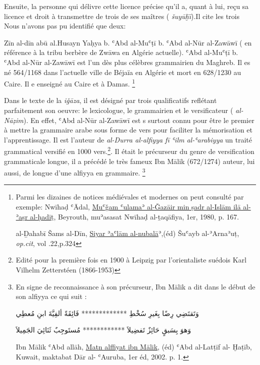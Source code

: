 \documentclass[a4paper,12pt]{report}
\begin{document}
Ensuite, la personne qui délivre cette licence précise  qu'il a, quant à lui, reçu sa licence et droit à transmettre de trois de ses maîtres ( \textit{šuyūḫ\=i}̄).Il cite les trois  
Nous n'avons pas pu identifié que deux: 

 Zīn al-dīn  abū al.Husayn Yaḥya b. ʿAbd al-Muʿṭī b. ʿAbd al-Nūr al-Zawāwī ( en référence à la tribu berbère de   Zw\=awa en  Algérie actuelle). 
  ʿAbd al-Muʿṭī b. ʿAbd al-Nūr al-Zawāwī est l'un dès plus célèbres grammairien du Maghreb.
  Il es né 564/1168  dans  l'actuelle ville de Béjaïa en Algérie  et mort en 628/1230 au Caire. Il e enseigné au Caire et à Damas. \footnote{ Parmi les dizaines de notices médiévales et modernes on peut consulté par exemple: Nwīhaḍ ʿĀdal, \underline {Muʿǧam ʿulamaʾ al-Ǧazāir min ṣadr al-Islām ilā al-ʾaṣr al-ḥadī}ṯ, Beyrouth,  muʾasasat Nwīhaḍ al-ṯaqāfiya, 1er, 1980, p. 167.
  
  al-Ḏahabī Šams al-Dīn, \underline  { Siyar ʾaʿlām al-nubalā}ʾ,(éd) Šuʿayb al-ʾArnaʾuṭ, \textit{op.cit}, vol
  .22,p.324}

Dans le texte de la \textit{iǧāza}, il est désigné par trois qualificatifs reflétant parfaitement son oeuvre: le lexicologue, le grammairien  et le versificateur ( \textit{al-Nāẓim}). En effet, ʿAbd al-Nūr al-Zawāwī est  s
surtout connu pour être le premier à mettre la grammaire arabe sous forme de vers pour faciliter la mémorisation et l'apprentissage. Il est l'auteur de \textit{al-Durra al-alfiyya fī ʿilm al-ʿarabiyya } un traité grammatical versifié en 1000 vers.\footnote{Edité pour la première fois en 1900 à Leipzig par l'orientaliste suédois Karl Vilhelm Zetterstéen (1866-1953)}. Il était le précurseur du genre de versification grammaticale longue, il a précédé le très fameux Ibn Mālik (672/1274) auteur, lui aussi, de longue d'une  alfiyya en grammaire. \footnote{En signe de  reconnaissance à son précurseur, Ibn Mālik a dit dans le début de son  alfiyya ce qui suit : 
\begin{Arabic}
    
وَتَقتَضِي رِضًا بِغَيرِ سُخْطِ ************* فَائِقَةً ألفِيَّةَ ابنِ مُعطِي

وَهوَ بِسَبقٍ حَائِزٌ تَفضِيلاَ ************ مُستَوجِبٌ ثَنَائِيَ الجَمِيلاَ
\end{Arabic}

 Ibn Mālik ʿAbd allāh, \underline{Matn alffiyat ibn Mālik},  (éd) ʿAbd al-Latṭīf al- Ḫaṭīb,  Kuwait, maktabat Dār al- ʿAuruba, 1er éd, 2002. p. 1.} 
\end{document}
